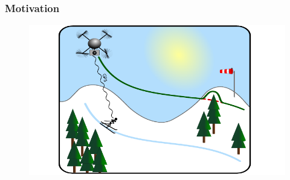 \begin{frame}
	\frametitle{Motivation}
	
	\begin{figure}[p]
		\centering
		\includegraphics[width=\columnwidth]{images/Motivationsfolie}
	\end{figure}
	
\end{frame}

